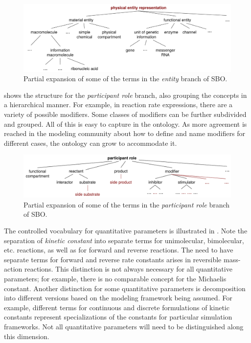 \begin{figure}[htb]
  \centering
  \vspace*{-1ex}
  \includegraphics[scale = 0.63]{figs/sbo-entity}
  \caption{Partial expansion of some of the terms in the
    \emph{entity} branch of SBO.}
  \label{fig:expanded-species}
\end{figure}

 shows the structure for the
\emph{participant role} branch, also grouping the concepts in a
hierarchical manner.  For example, in reaction rate expressions,
there are a variety of possible modifiers.  Some classes of
modifiers can be further subdivided and grouped.  All of this is
easy to capture in the ontology.  As more agreement is reached in
the modeling community about how to define and name modifiers for
different cases, the ontology can grow to accommodate it.

\begin{figure}[htb]
  \centering
  \includegraphics[scale = 0.67]{figs/sbo-participant-role}
  \caption{Partial expansion of some of the terms in the
    \emph{participant role} branch of SBO.}
  \label{fig:expanded-speciesRef}
\end{figure}

The controlled vocabulary for quantitative parameters is
illustrated in .  Note the
separation of \emph{kinetic constant} into separate terms for
unimolecular, bimolecular, etc. reactions, as well as for forward
and reverse reactions.  The need to have separate terms for
forward and reverse rate constants arises in reversible
mass-action reactions.  This distinction is not always necessary
for all quantitative parameters; for example, there is no
comparable concept for the Michaelis constant.  Another
distinction for some quantitative parameters is decomposition into
different versions based on the modeling framework being assumed.
For example, different terms for continuous and discrete
formulations of kinetic constants represent specializations of the
constants for particular simulation frameworks.  Not all
quantitative parameters will need to be distinguished along this
dimension.

